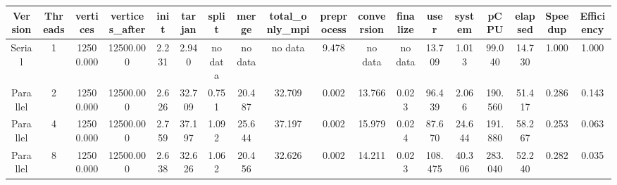 \begin{tabular}{|c|c|c|c|c|c|c|c|c|c|c|c|c|c|c|c|c|c|}
\toprule
 Version &  Threads &  vertices &  vertices\_after &  init &  tarjan &   split &   merge & total\_only\_mpi &  preprocess & conversion & finalize &    user &  system &    pCPU &  elapsed &  Speedup &  Efficiency \\
\midrule
  Serial &        1 & 12500.000 &       12500.000 & 2.231 &   2.940 & no data & no data &        no data &       9.478 &    no data &  no data &  13.709 &   1.013 &  99.040 &   14.730 &    1.000 &       1.000 \\
Parallel &        2 & 12500.000 &       12500.000 & 2.626 &  32.709 &   0.751 &  20.487 &         32.709 &       0.002 &     13.766 &    0.023 &  96.439 &   2.066 & 190.560 &   51.417 &    0.286 &       0.143 \\
Parallel &        4 & 12500.000 &       12500.000 & 2.759 &  37.197 &   1.092 &  25.644 &         37.197 &       0.002 &     15.979 &    0.024 &  87.670 &  24.644 & 191.880 &   58.267 &    0.253 &       0.063 \\
Parallel &        8 & 12500.000 &       12500.000 & 2.638 &  32.626 &   1.062 &  20.456 &         32.626 &       0.002 &     14.211 &    0.023 & 108.475 &  40.306 & 283.040 &   52.240 &    0.282 &       0.035 \\
\bottomrule
\end{tabular}

